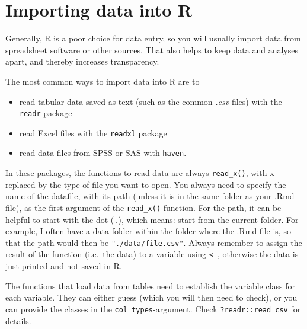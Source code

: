 \documentclass[
]{book}
\providecommand{\tightlist}{%
  \setlength{\itemsep}{0pt}\setlength{\parskip}{0pt}}
\begin{document}
\hypertarget{importing-data-into-r}{%
\section{Importing data into R}\label{importing-data-into-r}}

Generally, R is a poor choice for data entry, so you will usually import data from spreadsheet software or other sources. That also helps to keep data and analyses apart, and thereby increases transparency.

The most common ways to import data into R are to

\begin{itemize}
\tightlist
\item
  read tabular data saved as text (such as the common \emph{.csv} files) with the \texttt{readr} package
\item
  read Excel files with the \texttt{readxl} package
\item
  read data files from SPSS or SAS with \texttt{haven}.
\end{itemize}

In these packages, the functions to read data are always \texttt{read\_x()}, with x replaced by the type of file you want to open. You always need to specify the name of the datafile, with its path (unless it is in the same folder as your .Rmd file), as the first argument of the \texttt{read\_x()} function. For the path, it can be helpful to start with the dot (\texttt{.}), which means: start from the current folder. For example, I often have a data folder within the folder where the .Rmd file is, so that the path would then be \texttt{"./data/file.csv"}. Always remember to assign the result of the function (i.e.~the data) to a variable using \texttt{\textless{}-}, otherwise the data is just printed and not saved in R.

The functions that load data from tables need to establish the variable class for each variable. They can either guess (which you will then need to check), or you can provide the classes in the \texttt{col\_types}-argument. Check \texttt{?readr::read\_csv} for details.
\end{document}
